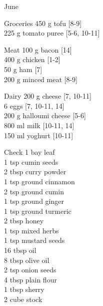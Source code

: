 \begin{menu}{June}
\begin{shoppinglist}{Groceries}
      450 g tofu {\scriptsize[8-9]}\\
      225 g tomato puree {\scriptsize[5-6, 10-11]}\\
      \end{shoppinglist}%
      \par\vfil %
      \begin{shoppinglist}{Meat}
      100 g bacon {\scriptsize[14]}\\
      400 g chicken {\scriptsize[1-2]}\\
      50 g ham {\scriptsize[7]}\\
      200 g minced meat {\scriptsize[8-9]}\\
      \end{shoppinglist}%
      \begin{shoppinglist}{Dairy}
      200 g cheese {\scriptsize[7, 10-11]}\\
      6  eggs {\scriptsize[7, 10-11, 14]}\\
      200 g halloumi cheese {\scriptsize[5-6]}\\
      800 ml milk {\scriptsize[10-11, 14]}\\
      150 ml yoghurt {\scriptsize[10-11]}\\
      \end{shoppinglist}%
      \par\vfil %
      \vfil\clearpage %
      \begin{shoppinglist}{Check}
      1  bay leaf \\
      1 tsp cumin seeds \\
      2 tbsp curry powder \\
      1 tsp ground cinnamon \\
      2 tsp ground cumin \\
      1 tsp ground ginger \\
      1 tsp ground turmeric \\
      2 tbsp honey \\
      1 tsp mixed herbs \\
      1 tsp mustard seeds \\
      16 tbsp oil \\
      8 tbsp olive oil \\
      2 tsp onion seeds \\
      4 tbsp plain flour \\
      1 tbsp sherry \\
      2 cube stock \\

\end{shoppinglist}
\end{menu}

